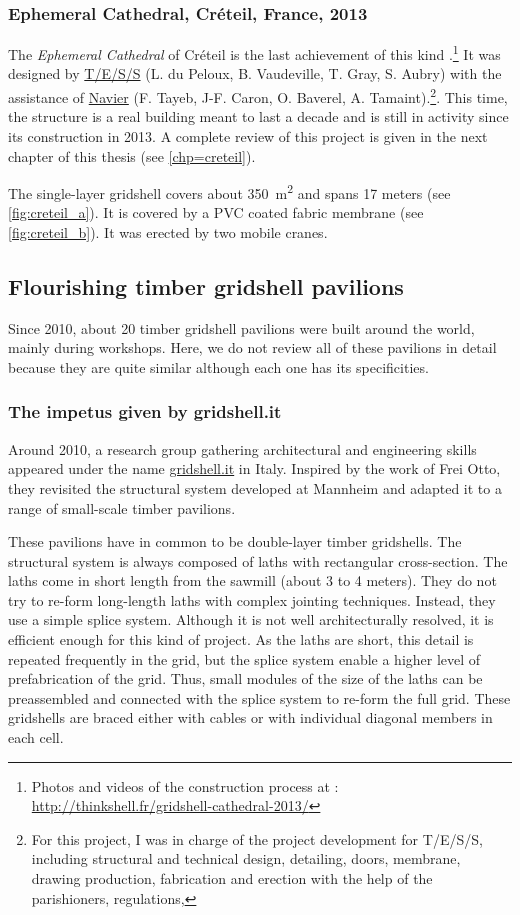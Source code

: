 \subsubsection{Ephemeral Cathedral, Créteil, France, 2013}
The \emph{Ephemeral Cathedral} of Créteil is the last achievement of this kind \cite{DuPeloux2016}.\footnote{Photos and videos of the construction process at : \url{http://thinkshell.fr/gridshell-cathedral-2013/}} It was designed by \href{http://www.tess.fr}{T/E/S/S} (L. du Peloux, B. Vaudeville, T. Gray, S. Aubry) with the assistance of \href{http://navier.enpc.fr}{Navier} (F. Tayeb, J-F. Caron, O. Baverel, A. Tamaint).\footnote{For this project, I was in charge of the project development for T/E/S/S, including structural and technical design, detailing, doors, membrane, drawing production, fabrication and erection with the help of the parishioners, regulations, \telp{}}. This time, the structure is a real building meant to last a decade and is still in activity since its construction in 2013. A complete review of this project is given in the next chapter of this thesis (see \cref{chp=creteil}).

The single-layer gridshell covers about \SI{350}{m^2} and spans 17 meters (see \cref{fig:creteil_a}). It is covered by a PVC coated fabric membrane (see \cref{fig:creteil_b}). It was erected by two mobile cranes.


\subsection{Flourishing timber gridshell pavilions}
Since 2010, about 20 timber gridshell pavilions were built around the world, mainly during workshops. Here, we do not review all of these pavilions in detail because they are quite similar although each one has its specificities.

\subsubsection{The impetus given by gridshell.it}
Around 2010, a research group gathering architectural and engineering skills appeared under the name \href{http://www.gridshell.it}{gridshell.it} in Italy. Inspired by the work of Frei Otto, they revisited the structural system developed at Mannheim and adapted it to a range of small-scale timber pavilions.

These pavilions have in common to be double-layer timber gridshells. The structural system is always composed of laths with rectangular cross-section. The laths come in short length  from the sawmill (about 3 to 4 meters). They do not try to re-form long-length laths with complex jointing techniques. Instead, they use a simple splice system. Although it is not well architecturally resolved, it is efficient enough for this kind of project. As the laths are short, this detail is repeated frequently in the grid, but the splice system enable a higher level of prefabrication of the grid. Thus, small modules of the size of the laths can be preassembled and connected with the splice system to re-form the full grid. These gridshells are braced either with cables or with individual diagonal members in each cell.

